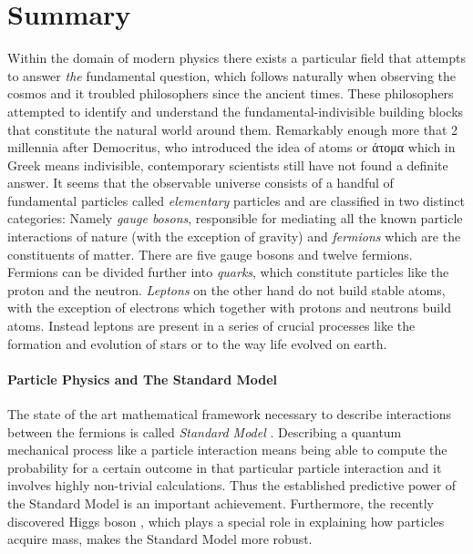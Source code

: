 \chapter*{Summary}
\chaptermark{}
%

Within the domain of modern physics there exists a particular field
that attempts to answer {\it the} fundamental question, which follows
naturally when observing the cosmos and it troubled
philosophers since the ancient times. These philosophers attempted to
identify and understand the fundamental-indivisible building blocks that constitute the natural world
around them. Remarkably enough more that 2 millennia after Democritus, who introduced
the idea of atoms or \textgreek{άτομα} which in Greek means indivisible,
contemporary scientists still have not found a definite answer.
It seems that the observable universe consists of a handful of fundamental particles
called {\it elementary} particles and are classified in two distinct categories:
Namely {\it gauge bosons}, responsible for mediating all the known particle interactions of
nature (with the exception of gravity) and {\it fermions} which are the constituents of
matter. There are five gauge bosons and twelve fermions. Fermions can be divided further
into {\it quarks}, which constitute particles like the proton and the neutron. {\it Leptons}
on the other hand do not build stable atoms, with the exception of electrons which together with
protons and neutrons build atoms. Instead leptons are present in a series of crucial processes
like the formation and evolution of stars or to the way life evolved on earth.


\subsubsection{Particle Physics and The Standard Model}
The state of the art mathematical framework necessary to describe interactions between the
fermions is called \textit{Standard Model} \cite{sm-glashow,sm-weinberg,sm-salam}.
Describing a quantum mechanical process like a particle interaction means being able
to compute the probability for a certain outcome in that particular particle interaction
and it involves highly non-trivial calculations. Thus the established predictive power of
the Standard Model is an important achievement. Furthermore, the recently
discovered Higgs boson \cite{higgs-cms,higgs-atlas}, which plays a special role in
explaining how particles acquire mass, makes the Standard Model more robust.


